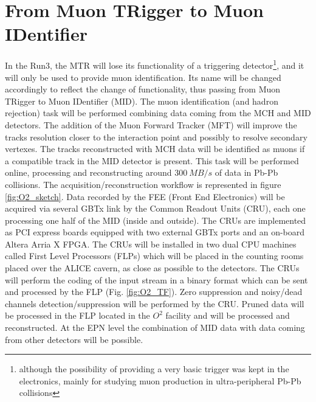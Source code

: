 \section{From Muon TRigger to Muon IDentifier}
In the Run3, the MTR will lose its functionality of a triggering detector\footnote{although the possibility of providing a very basic trigger was kept in the electronics, mainly for studying muon production in ultra-peripheral Pb-Pb collisions}, and it will only be used to provide muon identification. 
Its name will be changed accordingly to reflect the change of functionality, thus passing from Muon TRigger to Muon IDentifier (MID).
The muon identification (and hadron rejection) task will be performed combining data coming from the MCH and MID detectors.
The addition of the Muon Forward Tracker (MFT) \cite{CERN-LHCC-2015-001} will improve the tracks resolution closer to the interaction point and possibly to resolve secondary vertexes.
The tracks reconstructed with MCH data will be identified as muons if a compatible track in the MID detector is present.
This task will be performed online, processing and reconstructing around $300\ MB/s$ of data in Pb-Pb collisions.
The acquisition/reconstruction workflow is represented in figure \ref{fig:O2_sketch}.
Data recorded by the FEE (Front End Electronics) will be acquired via several GBTx link by the Common Readout Units (CRU), each one processing one half of the MID (inside and outside).
The CRUs are implemented as PCI express boards equipped with two external GBTx ports and an on-board Altera Arria X FPGA.
The CRUs will be installed in two dual CPU machines called First Level Processors (FLPs) which will be placed in the counting rooms placed over the ALICE cavern, as close as possible to the detectors.
The CRUs will perform the coding of the input stream in a binary format which can be sent and processed by the FLP (Fig. \ref{fig:O2_TF}).
Zero suppression and noisy/dead channels detection/suppression will be performed by the CRU.
Pruned data will be processed in the FLP located in the $O^2$ facility and will be processed and reconstructed.
At the EPN level the combination of MID data with data coming from other detectors will be possible.

